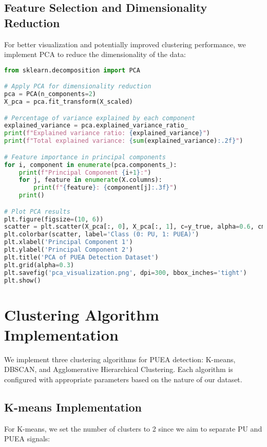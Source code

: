 \subsection{Feature Selection and Dimensionality Reduction}
For better visualization and potentially improved clustering performance, we implement PCA to reduce the dimensionality of the data:

\begin{lstlisting}[language=Python, caption=PCA Implementation]
from sklearn.decomposition import PCA

# Apply PCA for dimensionality reduction
pca = PCA(n_components=2)
X_pca = pca.fit_transform(X_scaled)

# Percentage of variance explained by each component
explained_variance = pca.explained_variance_ratio_
print(f"Explained variance ratio: {explained_variance}")
print(f"Total explained variance: {sum(explained_variance):.2f}")

# Feature importance in principal components
for i, component in enumerate(pca.components_):
    print(f"Principal Component {i+1}:")
    for j, feature in enumerate(X.columns):
        print(f"{feature}: {component[j]:.3f}")
    print()

# Plot PCA results
plt.figure(figsize=(10, 6))
scatter = plt.scatter(X_pca[:, 0], X_pca[:, 1], c=y_true, alpha=0.6, cmap='viridis')
plt.colorbar(scatter, label='Class (0: PU, 1: PUEA)')
plt.xlabel('Principal Component 1')
plt.ylabel('Principal Component 2')
plt.title('PCA of PUEA Detection Dataset')
plt.grid(alpha=0.3)
plt.savefig('pca_visualization.png', dpi=300, bbox_inches='tight')
plt.show()
\end{lstlisting}

\section{Clustering Algorithm Implementation}
We implement three clustering algorithms for PUEA detection: K-means, DBSCAN, and Agglomerative Hierarchical Clustering. Each algorithm is configured with appropriate parameters based on the nature of our dataset.

\subsection{K-means Implementation}
For K-means, we set the number of clusters to 2 since we aim to separate PU and PUEA signals:

